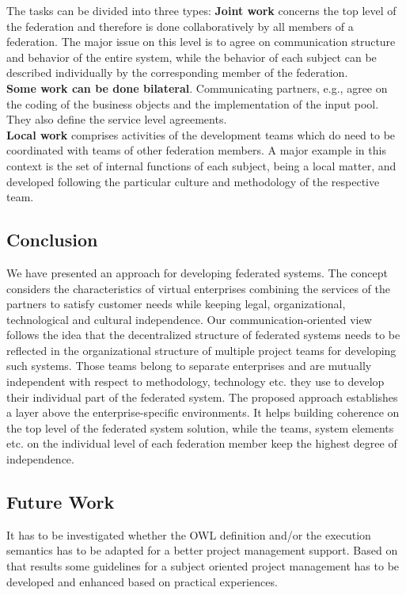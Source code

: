The tasks can be divided into three types:
\textbf{Joint work} concerns the top level of the federation and therefore is done collaboratively by all members of a federation. The major issue on this level is to agree on communication structure and behavior of the entire system, while the behavior of each subject can be described individually by the corresponding member of the federation.\\
\textbf{Some work can be done bilateral}. Communicating partners, e.g., agree on the coding of the business objects and the implementation of the input pool. They also define the service level agreements.\\
\textbf{Local work} comprises activities of the development teams which do need to be coordinated with teams of other federation members. A major example in this context is the set of internal functions of each subject, being a local matter, and developed following the particular culture and methodology of the respective team.
\\


\subsection{Conclusion}
We have presented an approach for developing federated systems. The concept considers the characteristics of virtual enterprises combining the services of the partners to satisfy customer needs while keeping legal, organizational, technological and cultural independence.
Our communication-oriented view follows the idea that the decentralized structure of federated systems needs to be reflected in the organizational structure of multiple project teams for developing such systems. Those teams belong to separate enterprises and are mutually independent with respect to methodology, technology etc. they use to develop their individual part of the federated system.
The proposed approach establishes a layer above the enterprise-specific environments. It helps building coherence on the top level of the federated system solution, while the teams, system elements etc. on the individual level of each federation member keep the highest degree of independence.

\subsection{Future Work}
It has to be investigated whether the OWL definition and/or the execution semantics has to be adapted for a better project management support. Based on that results some guidelines for a subject oriented project management has to be developed and enhanced based on practical experiences.


